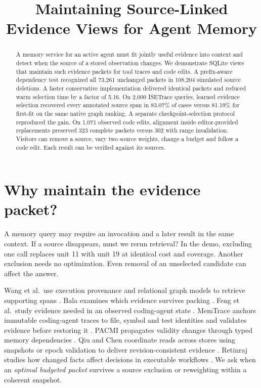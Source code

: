 \documentclass[conference]{IEEEtran}
\title{Maintaining Source-Linked Evidence Views for Agent Memory}
\author{}
\begin{document}
\maketitle
\begin{abstract}
A memory service for an active agent must fit jointly useful evidence into context and detect when the source of a stored observation changes. We demonstrate SQLite views that maintain such evidence packets for tool traces and code edits. A prefix-aware dependency test recognized all 73,261 unchanged packets in 108,204 simulated source deletions. A faster conservative implementation delivered identical packets and reduced warm selection time by a factor of 5.16. On 2,000 ISETrace queries, learned evidence selection recovered every annotated source span in 83.07\% of cases versus 81.19\% for first-fit on the same native graph ranking. A separate checkpoint-selection protocol reproduced the gain. On 1,071 observed code edits, alignment inside editor-provided replacements preserved 323 complete packets versus 302 with range invalidation. Visitors can remove a source, vary two source weights, change a budget and follow a code edit. Each result can be verified against its sources.

\end{abstract}

\section{Why maintain the evidence packet?}

A memory query may require an invocation and a later result in the same context. If a source disappears, must we rerun retrieval? In the demo, excluding one call replaces unit 11 with unit 19 at identical cost and coverage. Another exclusion needs no optimization. Even removal of an unselected candidate can affect the answer.

Wang et al.\ use execution provenance and relational graph models to retrieve supporting spans \cite{wang}. Bala examines which evidence survives packing \cite{bala}. Feng et al.\ study evidence needed in an observed coding-agent state \cite{feng}. MemTrace anchors immutable coding-agent traces to file, symbol and test identities and validates evidence before restoring it \cite{memtrace}. PACMI propagates validity changes through typed memory dependencies \cite{pacmi}. Qiu and Chen coordinate reads across stores using snapshots or epoch validation to deliver revision-consistent evidence \cite{readboundaries}. Retinraj studies how changed facts affect decisions in executable workflows \cite{changes}. We ask when an \emph{optimal budgeted packet} survives a source exclusion or reweighting within a coherent snapshot.
\end{document}
